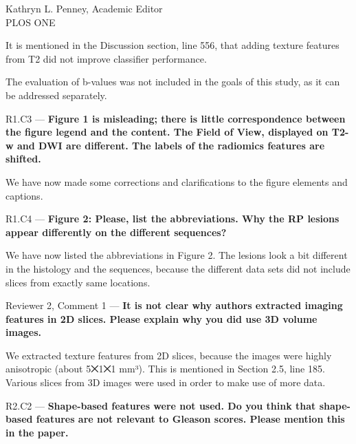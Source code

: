 \documentclass{letter}
\newenvironment{comment}[1]%
  {\vspace{5ex}\par\textsf{#1 ---}\ignorespaces\bfseries}%
  {\par\ignorespacesafterend}
\newenvironment{reply}%
  {\vspace{2ex}\par}%
  {\par\upshape}
\begin{document}
\begin{letter}{Kathryn L. Penney, Academic Editor \\ PLOS ONE}
\begin{reply}
It is mentioned in the Discussion section, line 556, that adding texture
features from T2 did not improve classifier performance.

The evaluation of b-values was not included in the goals of this study, as it
can be addressed separately.
\end{reply}


\begin{comment}{R1.C3}
Figure 1 is misleading; there is little correspondence between the figure legend
and the content. The Field of View, displayed on T2-w and DWI are different. The
labels of the radiomics features are shifted.
\end{comment}

\begin{reply}
We have now made some corrections and clarifications to the figure elements and
captions.
\end{reply}


\begin{comment}{R1.C4}
Figure 2: Please, list the abbreviations. Why the RP lesions appear differently
on the different sequences?
\end{comment}

\begin{reply}
We have now listed the abbreviations in Figure 2. The lesions look a bit
different in the histology and the sequences, because the different data sets
did not include slices from exactly same locations.
\end{reply}


\begin{comment}{Reviewer 2, Comment 1}
It is not clear why authors extracted imaging features in 2D slices. Please
explain why you did use 3D volume images.
\end{comment}

\begin{reply}
We extracted texture features from 2D slices, because the images were highly
anisotropic (about 5⨉1⨉1 mm³). This is mentioned in Section 2.5, line 185.
Various slices from 3D images were used in order to make use of more data.
\end{reply}


\begin{comment}{R2.C2}
Shape-based features were not used. Do you think that shape-based features are
not relevant to Gleason scores. Please mention this in the paper.
\end{comment}


\end{letter}
\end{document}
